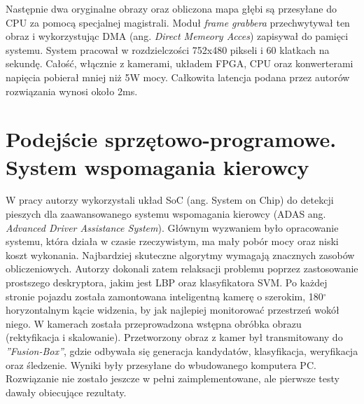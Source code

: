 Następnie dwa oryginalne obrazy oraz obliczona mapa głębi są przesyłane do CPU za pomocą specjalnej magistrali.
Moduł \textit{frame grabbera} przechwytywał ten obraz i wykorzystując DMA (ang. \textit{Direct Memeory Acces}) zapisywał do pamięci systemu.
System pracował w rozdzielczości 752x480 pikseli i 60 klatkach na sekundę.
Całość, włącznie z kamerami, układem FPGA, CPU oraz konwerterami napięcia pobierał mniej niż 5W mocy.
Całkowita latencja podana przez autorów rozwiązania wynosi około 2ms.


\section{Podejście sprzętowo-programowe. System wspomagania kierowcy}
W pracy \cite{piao2016real} autorzy wykorzystali układ SoC (ang. System on Chip) do detekcji pieszych dla zaawansowanego systemu wspomagania kierowcy (ADAS ang. \textit{Advanced Driver Assistance System}).
Głównym wyzwaniem było opracowanie systemu, która działa w czasie rzeczywistym, ma mały pobór mocy oraz niski koszt wykonania.
Najbardziej skuteczne algorytmy wymagają znacznych zasobów obliczeniowych. %
Autorzy dokonali zatem relaksacji problemu poprzez zastosowanie prostszego deskryptora, jakim jest LBP oraz klasyfikatora SVM.
Po każdej stronie pojazdu została zamontowana inteligentną kamerę o szerokim, 180$^\circ$ horyzontalnym kącie widzenia, by jak najlepiej monitorować przestrzeń wokół niego.
W kamerach została przeprowadzona wstępna obróbka obrazu (rektyfikacja i skalowanie).
Przetworzony obraz z kamer był transmitowany do \textit{''Fusion-Box''}, gdzie odbywała się generacja kandydatów, klasyfikacja, weryfikacja oraz śledzenie.
Wyniki były przesyłane do wbudowanego komputera PC.
Rozwiązanie nie zostało jeszcze w pełni zaimplementowane, ale pierwsze testy dawały obiecujące rezultaty.

